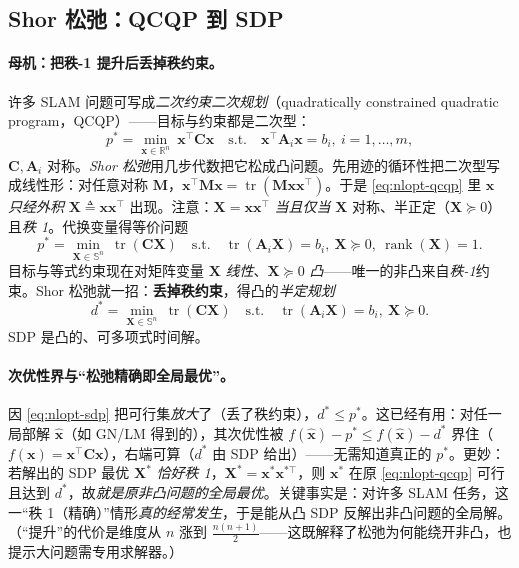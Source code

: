\subsection{Shor 松弛：QCQP 到 SDP}
\label{sec:nlopt-certifiable-shor}

\paragraph{母机：把秩-1 提升后丢掉秩约束。}\cite{rosen2019sesync,carlone2026handbook}
许多 SLAM 问题可写成\emph{二次约束二次规划}（quadratically constrained quadratic program，QCQP）——目标与约束都是二次型：
\begin{equation}
  p^*=\min_{\mathbf{x}\in\mathbb{R}^n}\ \mathbf{x}^\top\mathbf{C}\mathbf{x}
  \quad\text{s.t.}\quad \mathbf{x}^\top\mathbf{A}_i\mathbf{x}=b_i,\ i=1,\dots,m,
  \label{eq:nlopt-qcqp}
\end{equation}
$\mathbf{C},\mathbf{A}_i$ 对称。\emph{Shor 松弛}用几步代数把它松成凸问题。先用迹的循环性把二次型写成线性形：对任意对称 $\mathbf{M}$，$\mathbf{x}^\top\mathbf{M}\mathbf{x}=\operatorname{tr}(\mathbf{M}\mathbf{x}\mathbf{x}^\top)$。于是 \cref{eq:nlopt-qcqp} 里 $\mathbf{x}$ \emph{只经外积} $\mathbf{X}\triangleq\mathbf{x}\mathbf{x}^\top$ 出现。注意：$\mathbf{X}=\mathbf{x}\mathbf{x}^\top$ \emph{当且仅当} $\mathbf{X}$ 对称、半正定（$\mathbf{X}\succeq0$）且\emph{秩 1}。代换变量得等价问题
\begin{equation}
  p^*=\min_{\mathbf{X}\in\mathbb{S}^n}\ \operatorname{tr}(\mathbf{C}\mathbf{X})
  \quad\text{s.t.}\quad \operatorname{tr}(\mathbf{A}_i\mathbf{X})=b_i,\ \mathbf{X}\succeq0,\ \operatorname{rank}(\mathbf{X})=1.
  \label{eq:nlopt-qcqp-lifted}
\end{equation}
目标与等式约束现在对矩阵变量 $\mathbf{X}$ \emph{线性}、$\mathbf{X}\succeq0$ \emph{凸}——唯一的非凸来自\emph{秩-1}约束。Shor 松弛就一招：\textbf{丢掉秩约束}，得凸的\emph{半定规划}
\begin{equation}
  d^*=\min_{\mathbf{X}\in\mathbb{S}^n}\ \operatorname{tr}(\mathbf{C}\mathbf{X})
  \quad\text{s.t.}\quad \operatorname{tr}(\mathbf{A}_i\mathbf{X})=b_i,\ \mathbf{X}\succeq0.
  \label{eq:nlopt-sdp}
\end{equation}
SDP 是凸的、可多项式时间解。

\paragraph{次优性界与“松弛精确即全局最优”。}\cite{rosen2019sesync}
因 \cref{eq:nlopt-sdp} 把可行集\emph{放大}了（丢了秩约束），$d^*\le p^*$。这已经有用：对任一局部解 $\hat{\mathbf{x}}$（如 GN/LM 得到的），其次优性被 $f(\hat{\mathbf{x}})-p^*\le f(\hat{\mathbf{x}})-d^*$ 界住（$f(\mathbf{x})=\mathbf{x}^\top\mathbf{C}\mathbf{x}$），右端可算（$d^*$ 由 SDP 给出）——无需知道真正的 $p^*$。更妙：若解出的 SDP 最优 $\mathbf{X}^*$ \emph{恰好秩 1}，$\mathbf{X}^*=\mathbf{x}^*\mathbf{x}^{*\top}$，则 $\mathbf{x}^*$ 在原 \cref{eq:nlopt-qcqp} 可行且达到 $d^*$，故\emph{就是原非凸问题的全局最优}。关键事实是：对许多 SLAM 任务，这一“秩 1（精确）”情形\emph{真的经常发生}，于是能从凸 SDP 反解出非凸问题的全局解。（“提升”的代价是维度从 $n$ 涨到 $\tfrac{n(n+1)}{2}$——这既解释了松弛为何能绕开非凸，也提示大问题需专用求解器。）

